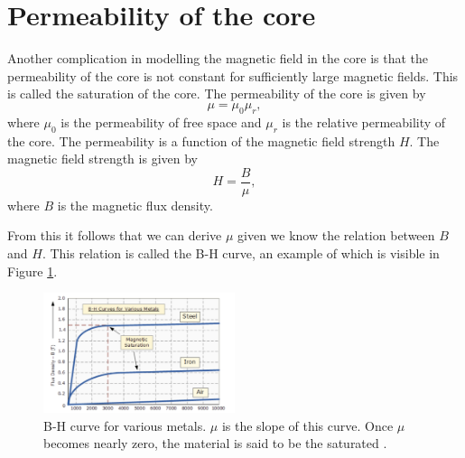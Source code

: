 \section{Permeability of the core}
Another complication in modelling the magnetic field in the core is that the permeability of the core is not constant for sufficiently large magnetic fields.
This is called the saturation of the core. The permeability of the core is given by
\begin{equation}
    \mu = \mu_0 \mu_r,
\end{equation}
where $\mu_0$ is the permeability of free space and $\mu_r$ is the relative permeability of the core. The permeability is a function of the magnetic field strength $H$.
The magnetic field strength is given by
\begin{equation}
    H = \frac{B}{\mu},
\end{equation}
where $B$ is the magnetic flux density. 

From this it follows that we can derive $\mu$ given we know the relation between $B$ and $H$. 
This relation is called the B-H curve, an example of which is visible in Figure \ref{fig:bhcurve}.
\begin{figure}[H]
    \centering
    \includegraphics[width=0.5\textwidth]{img/BH_curve.png}
    \caption{B-H curve for various metals. $\mu$ is the slope of this curve. Once $\mu$ becomes nearly zero, the material is said 
    to be the saturated \cite{bhcurve}.}
    \label{fig:bhcurve}
\end{figure}

